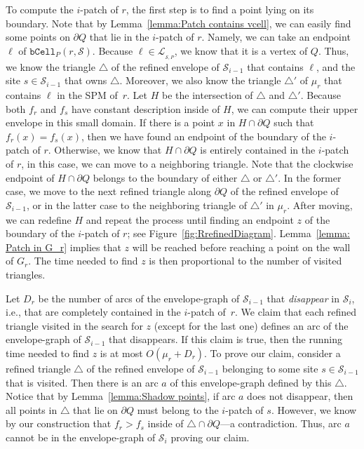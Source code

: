 \documentclass[a4paper,UKenglish]{socg-lipics-v2018}
\newcommand{\icell}[1][i]{${#1}$-patch\xspace}
\newcommand{\s}{\mathcal S}
\newcommand{\bcell}[2][P]{\ensuremath{\mathtt{bCell}_{\scriptscriptstyle #1}(#2)}}
\newcommand{\LL}[1][\s, P]{\ensuremath{\mathcal L_{_{#1}}}}
\begin{document}
To compute the \icell of $r$, the first step is to find a point lying on its boundary.
Note that by Lemma~\ref{lemma:Patch contains vcell}, we can easily find some points on $\partial Q$ that lie in the \icell of $r$.
Namely, we can take an endpoint $\ell$ of $\bcell{r, \s}$. 
Because $\ell\in \LL$, we know that it is a vertex of $Q$.
Thus, we know the triangle $\triangle$ of the refined envelope of $\s_{i-1}$ that contains $\ell$, and the site $s\in \s_{i-1}$ that owns $\triangle$.
Moreover, we also know the triangle $\triangle'$ of $\mu_r$ that contains $\ell$ in the SPM of~$r$.
Let $H$ be the intersection of $\triangle$ and $\triangle'$.
Because both $f_r$ and $f_s$ have constant description inside of $H$, we can compute their upper envelope in this small domain.
If there is a point $x$ in $H\cap \partial Q$ such that $f_r(x) = f_s(x)$, then we have found an endpoint of the boundary of the \icell of $r$.
Otherwise, we know that $H\cap \partial Q$ is entirely contained in the \icell of $r$, in this case, we can move to a neighboring triangle.
Note that the clockwise endpoint of $H\cap \partial Q$ belongs to the boundary of either $\triangle$ or $\triangle'$. 
In the former case, we move to the next refined triangle along $\partial Q$ of the refined envelope of $\s_{i-1}$, 
or in the latter case to the neighboring triangle of $\triangle'$ in $\mu_r$.
After moving, we can redefine $H$ and repeat the process until finding an endpoint $z$ of the boundary of the \icell of $r$; see Figure~\ref{fig:RrefinedDiagram}. 
Lemma~\ref{lemma: Patch in G_r} implies that $z$ will be reached before reaching a point on the wall of $G_r$.
The time needed to find $z$ is then proportional to the number of visited triangles. 

Let $D_r$ be the number of arcs of the envelope-graph of $\s_{i-1}$ that \emph{disappear} in $\s_i$, i.e., that are completely contained in the \icell of~$r$.
We claim that each refined triangle visited in the search for $z$ (except for the last one) defines an arc of  the  envelope-graph of $\s_{i-1}$ that disappears. 
If this claim is true, then the running time needed to find $z$ is at most $O(\mu_r + D_r)$.
To prove our claim, consider a refined triangle $\triangle$ of the refined envelope of $\s_{i-1}$ belonging to some site $s\in \s_{i-1}$ that is visited. 
Then there is an arc $a$ of this envelope-graph defined by this $\triangle$. 
Notice that by Lemma~\ref{lemma:Shadow points}, if arc $a$ does not disappear, then all points in $\triangle$ that lie on $\partial Q$ must belong to the \icell of $s$. 
However, we know by our construction that $f_r > f_s$ inside of $\triangle\cap \partial Q$---a contradiction. 
Thus, arc $a$ cannot be in the envelope-graph of $\s_i$ proving our claim. 
\end{document}
